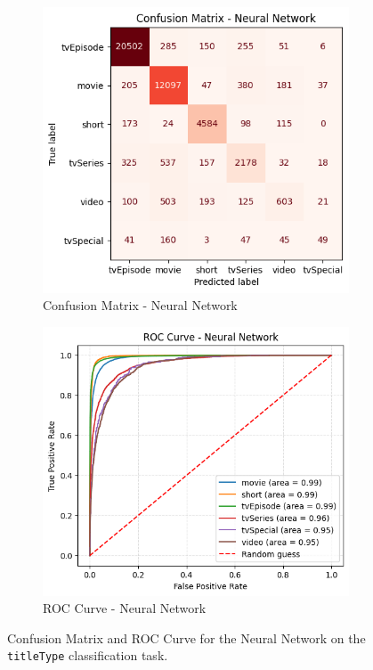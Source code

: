 
\begin{figure}[H]
    \centering
    \begin{subfigure}[b]{0.47\textwidth}
        \centering
        \includegraphics[width=\textwidth]{plotsss/cm_nn_titletype.png}
        \caption{Confusion Matrix - Neural Network}
        \label{fig:cm_nn_titletype}
    \end{subfigure}
    \hfill
    \begin{subfigure}[b]{0.50\textwidth}
        \centering
        \includegraphics[width=\textwidth]{plotsss/roc_nn_titletype.png}
        \caption{ROC Curve - Neural Network}
        \label{fig:roc_nn_titletype}
    \end{subfigure}
    \caption{Confusion Matrix and ROC Curve for the Neural Network on the \texttt{titleType} classification task.}
    \label{fig:cm_nn_titletype}
\end{figure}

